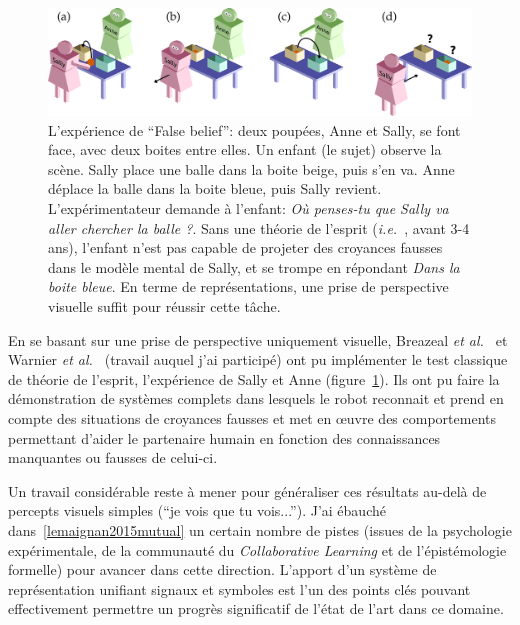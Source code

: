 \documentclass[a4paper]{article}
\newcommand{\etal}{{\textit{et al.~}}}
\newcommand{\ie}{{\textit{i.e.~}}}
\begin{document}
\begin{figure}[h!t]
        \centering
        \includegraphics[width=1.0\linewidth]{sally_ann}
        \caption{\small L'expérience de ``False belief'': deux poupées, Anne
            et Sally, se font face, avec deux boites entre elles. Un enfant
            (le sujet) observe la scène. Sally place une balle dans la boite
            beige, puis s'en va. Anne déplace la balle dans la boite bleue, puis
            Sally revient. L'expérimentateur demande à l'enfant: \emph{Où
            penses-tu que Sally va aller chercher la balle ?}. Sans une théorie
            de l'esprit (\ie, avant 3-4 ans), l'enfant n'est pas capable de
            projeter des croyances fausses dans le modèle mental de Sally, et se
            trompe en répondant \emph{Dans la boite bleue}. En terme de
            représentations, une prise de perspective visuelle suffit pour
            réussir cette tâche.}
        \label{false-beliefs}
\end{figure}

En se basant sur une prise de perspective uniquement visuelle, Breazeal
\etal\cite{breazeal2009embodied} et Warnier \etal\cite{warnier2012when} (travail
auquel j'ai participé) ont pu implémenter le test classique de théorie de
l'esprit, l'expérience de Sally et Anne (figure~\ref{false-beliefs}). Ils ont pu
faire la démonstration de systèmes complets dans lesquels le robot reconnait et
prend en compte des situations de croyances fausses et met en \oe uvre des
comportements permettant d'aider le partenaire humain en fonction des
connaissances manquantes ou fausses de celui-ci.

Un travail considérable reste à mener pour généraliser ces résultats au-delà de
percepts visuels simples (``je vois que tu vois...'').
J'ai ébauché dans~\ref{lemaignan2015mutual} un certain nombre de pistes (issues
de la psychologie expérimentale, de la communauté du \emph{Collaborative
Learning} et de l'épistémologie formelle) pour avancer dans cette direction.
L'apport d'un système de représentation unifiant signaux et symboles est l'un
des points clés pouvant effectivement permettre un progrès significatif de
l'état de l'art dans ce domaine.
\end{document}
